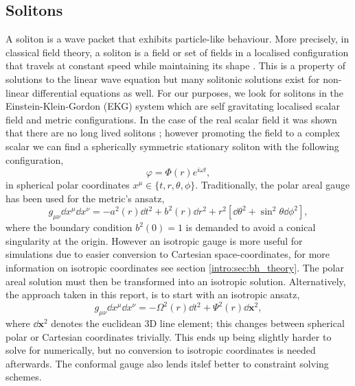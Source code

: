 \subsection{Solitons} \label{boson:sec:soliton}
A soliton is a wave packet that exhibits particle-like behaviour. More precisely, in classical field theory, a soliton
is a field or set of fields in a localised configuration that travels at constant speed \color{orchid} while maintaining its shape \color{black}. This is a property of solutions to the linear wave equation but many solitonic solutions exist for non-linear differential equations as well. For
our purposes, we look for solitons in the Einstein-Klein-Gordon (EKG) system which are self gravitating
localised scalar field and metric configurations. In the case of the real scalar field it was shown that
there are no long lived solitons \cite{diez2013no}; however promoting the field to a complex scalar we can find a spherically
symmetric stationary soliton with the following configuration,
\begin{equation} \varphi = \Phi(r)e^{i\omega t}, \label{boson:eq:fieldansatz} \end{equation}
in spherical polar coordinates $x^\mu \in \{t,r,\theta,\phi \}$.
Traditionally, the polar areal gauge has been used for the metric's ansatz,
\begin{equation}g_{\mu\nu}\dd x^\mu \dd x^\nu =- a^2(r)\dd t^2 + b^2(r) \dd r^2 + r^2 \left[ \dd \theta^2 + \sin^2\theta \dd \phi^2\right],\label{boson:eq:polaransatz}\end{equation}
where the boundary condition $b^2(0)=1$ is demanded to avoid a conical singularity at the origin. However an isotropic gauge is more useful for simulations due to easier conversion to Cartesian space-coordinates, for more information on isotropic coordinates see section \ref{intro:sec:bh_theory}. The polar areal solution must then be transformed into an isotropic solution. Alternatively, the approach taken in this report, is to start with an isotropic ansatz,
\begin{equation} g_{\mu\nu}\dd x^\mu \dd x^\nu =- \Omega^2(r)\dd t^2 + \Psi^2(r)\dd \bm{x}^2,\label{boson:eq:metricansatz}\end{equation}
where $\dd \bm{x}^2$ denotes the euclidean 3D line element; this changes between spherical polar or Cartesian coordinates trivially. This ends up being slightly harder to solve for numerically, but no conversion to isotropic coordinates is needed afterwards. \color{orchid} The conformal gauge also lends itslef better to constraint solving schemes. \color{black}

